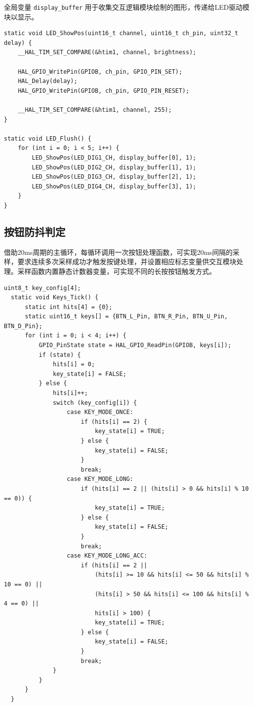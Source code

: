 \documentclass[a4paper,11pt,UTF8]{ctexart}
\begin{document}
全局变量 \lstinline{display_buffer} 用于收集交互逻辑模块绘制的图形，传递给LED驱动模块以显示。

\begin{lstlisting}[caption={LED驱动},captionpos=b]
  static void LED_ShowPos(uint16_t channel, uint16_t ch_pin, uint32_t delay) {
    __HAL_TIM_SET_COMPARE(&htim1, channel, brightness);

    HAL_GPIO_WritePin(GPIOB, ch_pin, GPIO_PIN_SET);
    HAL_Delay(delay);
    HAL_GPIO_WritePin(GPIOB, ch_pin, GPIO_PIN_RESET);

    __HAL_TIM_SET_COMPARE(&htim1, channel, 255);
}

static void LED_Flush() {
    for (int i = 0; i < 5; i++) {
        LED_ShowPos(LED_DIG1_CH, display_buffer[0], 1);
        LED_ShowPos(LED_DIG2_CH, display_buffer[1], 1);
        LED_ShowPos(LED_DIG3_CH, display_buffer[2], 1);
        LED_ShowPos(LED_DIG4_CH, display_buffer[3], 1);
    }
}
\end{lstlisting}

\subsection{按钮防抖判定}

借助20ms周期的主循环，每循环调用一次按钮处理函数，可实现20ms间隔的采样，要求连续多次采样成功才触发按键处理，并设置相应标志变量供交互模块处理。采样函数内置静态计数器变量，可实现不同的长按按钮触发方式。

\begin{lstlisting}[caption={按钮防抖判定},captionpos=b]
  uint8_t key_config[4];
  static void Keys_Tick() {
      static int hits[4] = {0};
      static uint16_t keys[] = {BTN_L_Pin, BTN_R_Pin, BTN_U_Pin, BTN_D_Pin};
      for (int i = 0; i < 4; i++) {
          GPIO_PinState state = HAL_GPIO_ReadPin(GPIOB, keys[i]);
          if (state) {
              hits[i] = 0;
              key_state[i] = FALSE;
          } else {
              hits[i]++;
              switch (key_config[i]) {
                  case KEY_MODE_ONCE:
                      if (hits[i] == 2) {
                          key_state[i] = TRUE;
                      } else {
                          key_state[i] = FALSE;
                      }
                      break;
                  case KEY_MODE_LONG:
                      if (hits[i] == 2 || (hits[i] > 0 && hits[i] % 10 == 0)) {
                          key_state[i] = TRUE;
                      } else {
                          key_state[i] = FALSE;
                      }
                      break;
                  case KEY_MODE_LONG_ACC:
                      if (hits[i] == 2 ||
                          (hits[i] >= 10 && hits[i] <= 50 && hits[i] % 10 == 0) ||
                          (hits[i] > 50 && hits[i] <= 100 && hits[i] % 4 == 0) ||
                          hits[i] > 100) {
                          key_state[i] = TRUE;
                      } else {
                          key_state[i] = FALSE;
                      }
                      break;
              }
          }
      }
  }
\end{lstlisting}
\end{document}
